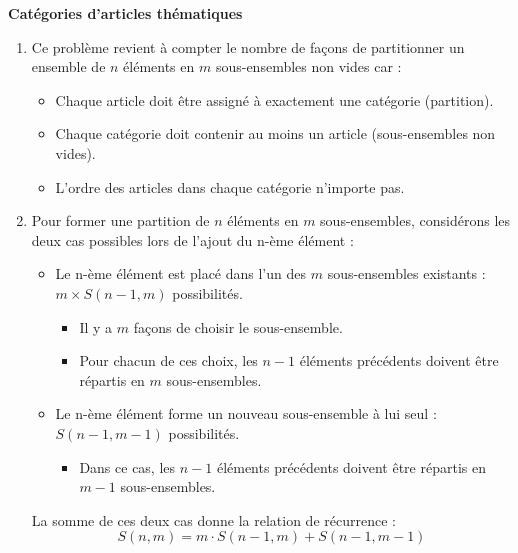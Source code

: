 \documentclass[10pt,a4paper]{article}
\begin{document}
\q \textbf{Catégories d'articles thématiques}
    \begin{enumerate}

        \item Ce problème revient à compter le nombre de façons de partitionner un ensemble de $n$
        éléments en $m$ sous-ensembles non vides car :
        \begin{itemize}
            \item Chaque article doit être assigné à exactement une catégorie (partition).
            \item Chaque catégorie doit contenir au moins un article (sous-ensembles non vides).
            \item L'ordre des articles dans chaque catégorie n'importe pas.
        \end{itemize}

        \item Pour former une partition de $n$ éléments en $m$ sous-ensembles, considérons les deux
        cas possibles lors de l'ajout du n-ème élément :
        \begin{itemize}
            \item Le n-ème élément est placé dans l'un des $m$ sous-ensembles existants : $ m \times S(n-1,m)$ possibilités.
            \begin{itemize}
                \item Il y a $m$ façons de choisir le sous-ensemble.
                \item Pour chacun de ces choix, les $n-1$ éléments précédents doivent être répartis
                en $m$ sous-ensembles.
            \end{itemize}

            \item Le n-ème élément forme un nouveau sous-ensemble à lui seul : $ S(n-1,m-1)$
            possibilités.
            \begin{itemize}
                \item Dans ce cas, les $n-1$ éléments précédents doivent être répartis en $m-1$
                sous-ensembles.
            \end{itemize}
        \end{itemize}

        La somme de ces deux cas donne la relation de récurrence :
        $$ S(n, m) = m \cdot S(n-1, m) + S(n-1, m-1) $$


\end{enumerate}
\end{document}
